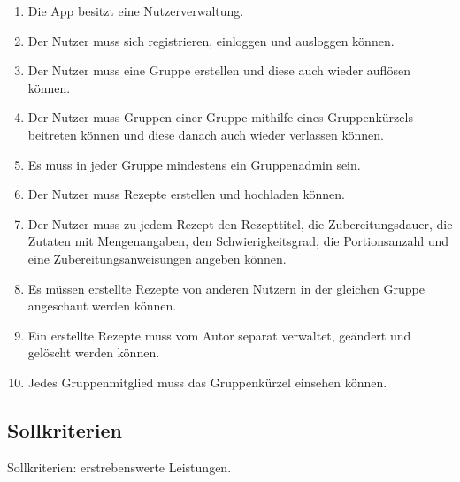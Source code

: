 \documentclass[parskip=full]{scrartcl}
\begin{document}
\begin{enumerate}[start=1,label={$\langle$\bfseries RM\arabic*$\rangle$}, leftmargin = 5em, itemsep=4pt, parsep=4pt]

    \item Die App besitzt eine Nutzerverwaltung.\label{RM1}
    \item Der Nutzer muss sich registrieren, einloggen und ausloggen können.\label{RM2}
    \item Der Nutzer muss eine Gruppe erstellen und diese auch wieder auflösen können.\label{RM3}
    \item Der Nutzer muss Gruppen einer Gruppe mithilfe eines Gruppenkürzels beitreten können und diese danach auch wieder verlassen können.\label{RM4}
    \item Es muss in jeder Gruppe mindestens ein Gruppenadmin sein.\label{RM5}
    \item Der Nutzer muss Rezepte erstellen und hochladen können.\label{RM6}
    \item Der Nutzer muss zu jedem Rezept den Rezepttitel, die Zubereitungsdauer, die Zutaten mit Mengenangaben, den Schwierigkeitsgrad, die Portionsanzahl und eine Zubereitungsanweisungen angeben können.\label{RM7}
    \item Es müssen erstellte Rezepte von anderen Nutzern in der gleichen Gruppe angeschaut werden können.\label{RM8}
    \item Ein erstellte Rezepte muss vom Autor separat verwaltet, geändert und gelöscht werden können.\label{RM9}
    \item Jedes Gruppenmitglied muss das Gruppenkürzel einsehen können.\label{RM10}
\end{enumerate}

\subsection{Sollkriterien}
Sollkriterien: erstrebenswerte Leistungen.
\end{document}
